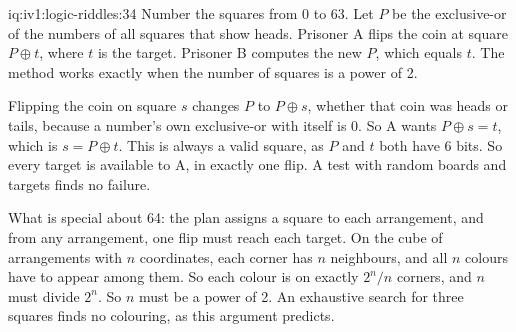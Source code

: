 \begin{solution}{iq:iv1:logic-riddles:34}
Number the squares from 0 to 63. Let $P$ be the exclusive-or of the numbers of all squares that show heads. Prisoner A flips the coin at square $P \oplus t$, where $t$ is the target. Prisoner B computes the new $P$, which equals $t$. The method works exactly when the number of squares is a power of 2.

Flipping the coin on square $s$ changes $P$ to $P \oplus s$, whether that coin was heads or tails, because a number's own exclusive-or with itself is 0. So A wants $P \oplus s = t$, which is $s = P \oplus t$. This is always a valid square, as $P$ and $t$ both have 6 bits. So every target is available to A, in exactly one flip. A test with random boards and targets finds no failure.

What is special about 64: the plan assigns a square to each arrangement, and from any arrangement, one flip must reach each target. On the cube of arrangements with $n$ coordinates, each corner has $n$ neighbours, and all $n$ colours have to appear among them. So each colour is on exactly $2^n/n$ corners, and $n$ must divide $2^n$. So $n$ must be a power of 2. An exhaustive search for three squares finds no colouring, as this argument predicts.

\end{solution}

